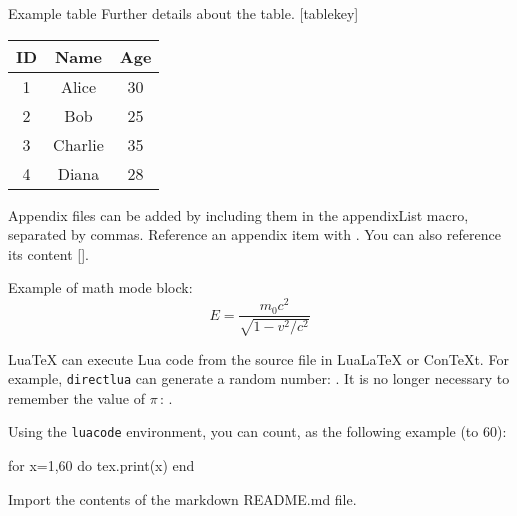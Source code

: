 \begin{wrtxArticleTableEnv}
    {Example table}
    {Further details about the table.}
    [tablekey]
    \begin{tabular}{|c|c|c|}
        \hline
        \textbf{ID} & \textbf{Name} & \textbf{Age} \\
        \hline
        1 & Alice & 30 \\
        2 & Bob & 25 \\
        3 & Charlie & 35 \\
        4 & Diana & 28 \\
        \hline
    \end{tabular}
\end{wrtxArticleTableEnv}




Appendix files can be added by including them in the appendixList macro, separated by commas.
Reference an appendix item with . You can also reference its content [].


\lipsum[1][1-4]


Example of math mode block:
\begin{displaymath}
    E = \frac{m_{0} c^{2}}{\sqrt{1-v^{2}/c^{2}}}
\end{displaymath}



Lua\TeX{} can execute Lua code from the source file in Lua\LaTeX{} or Con\TeX{}t. For example, \texttt{directlua}
can generate a random number: .
It is no longer necessary to remember the value of $π$ :
.

Using the \texttt{luacode} environment, you can count, as the following example (to 60):
\begin{luacode}
  for x=1,60 do
    tex.print(x)
  end
\end{luacode}



Import the contents of the markdown README.md file.
\wrtxInputREADME
